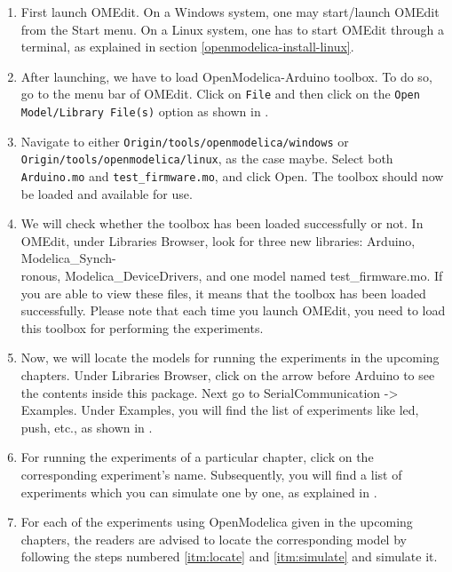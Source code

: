 \begin{enumerate}
      \item First launch OMEdit. On a Windows system, one may start/launch
            OMEdit from the Start menu. On a Linux system, one has to
            start OMEdit through a terminal, as
            explained in section \ref{openmodelica-install-linux}.
      \item After launching, we have to load OpenModelica-Arduino
            toolbox. To do so, go to the menu bar of OMEdit. 
            Click on {\tt File} and then click on
            the {\tt Open Model/Library File(s)} option as shown in .
      \item Navigate to either {\tt Origin/tools/openmodelica/windows} or {\tt Origin/tools/openmodelica/linux}, as the case maybe.
            Select both {\tt Arduino.mo} and {\tt test\_firmware.mo}, and click Open. The toolbox should now be loaded and available for use. 
      \item \label{itm:library} We will check whether the toolbox has been loaded successfully or not. 
            In OMEdit, under Libraries Browser, look for three new libraries: Arduino,
            Modelica\_Synch-\\ronous, Modelica\_DeviceDrivers, and one model named test\_firmware.mo. 
            If you are able to view these files, it means that the toolbox has been loaded successfully. 
            Please note that each time you launch OMEdit, you need to load this toolbox for
            performing the experiments. 
      \item \label{itm:locate} Now, we will locate the models for running the experiments in the upcoming chapters. 
            Under Libraries Browser, click on the arrow before Arduino to see the 
            contents inside this package. Next go to SerialCommunication -> Examples. 
            Under Examples, you will find the list of experiments like led, push, etc., 
            as shown in .
      \item \label{itm:simulate} For running the experiments of a particular chapter, click on the corresponding 
            experiment's name. Subsequently, you will find a list of experiments which you can 
            simulate one by one, as explained in .
      \item For each of the experiments using OpenModelica given in the upcoming chapters, the readers 
            are advised to locate the corresponding model by following the steps
            numbered \ref{itm:locate} and \ref{itm:simulate} and simulate it.  
\end{enumerate}



